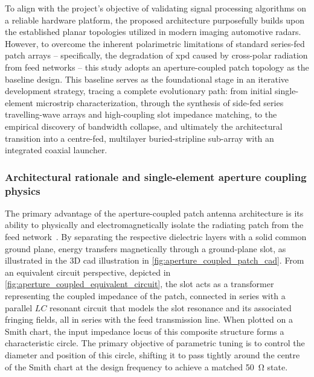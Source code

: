 To align with the project's objective of validating signal processing algorithms on a reliable hardware platform, the proposed architecture purposefully builds upon the established planar topologies utilized in modern imaging automotive radars.
However, to overcome the inherent polarimetric limitations of standard series-fed patch arrays -- specifically, the degradation of \gls{xpd} caused by cross-polar radiation from feed networks -- this study adopts an aperture-coupled patch topology as the baseline design.
This baseline serves as the foundational stage in an iterative development strategy, tracing a complete evolutionary path: from initial single-element microstrip characterization, through the synthesis of side-fed series travelling-wave arrays and high-coupling slot impedance matching, to the empirical discovery of bandwidth collapse, and ultimately the architectural transition into a centre-fed, multilayer buried-stripline sub-array with an integrated coaxial launcher.


\subsubsection{Architectural rationale and single-element aperture coupling physics}
\label{sec:element-design}

The primary advantage of the aperture-coupled patch antenna architecture is its ability to physically and electromagnetically isolate the radiating patch from the feed network~\parencite{pozarMicrostripAntennaAperturecoupled1985}.
By separating the respective dielectric layers with a solid common ground plane, energy transfers magnetically through a ground-plane slot, as illustrated in the 3D \gls{cad} illustration in \cref{fig:aperture_coupled_patch_cad}.
From an equivalent circuit perspective, depicted in \cref{fig:aperture_coupled_equivalent_circuit}, the slot acts as a transformer representing the coupled impedance of the patch, connected in series with a parallel $LC$ resonant circuit that models the slot resonance and its associated fringing fields, all in series with the feed transmission line.
When plotted on a Smith chart, the input impedance locus of this composite structure forms a characteristic circle.
The primary objective of parametric tuning is to control the diameter and position of this circle, shifting it to pass tightly around the centre of the Smith chart at the design frequency to achieve a matched \qty{50}{\ohm} state.

